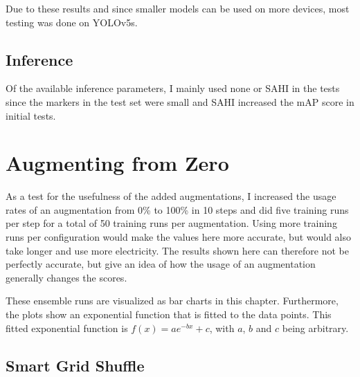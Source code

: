 \documentclass[10pt]{book}
\begin{document}

Due to these results and since smaller models can be used on more devices, most testing was done on \ac{YOLO}v5s.

\subsection{Inference}

Of the available inference parameters, I mainly used none or \ac{SAHI} in the tests since the markers in the test set were small and \ac{SAHI} increased the \ac{mAP} score in initial tests.

\section{Augmenting from Zero} %
\label{sec:aug_ens_zero}

As a test for the usefulness of the added augmentations, I increased the usage rates of an augmentation from 0\% to 100\% in 10 steps and did five training runs per step for a total of 50 training runs per augmentation. Using more training runs per configuration would make the values here more accurate, but would also take longer and use more electricity. The results shown here can therefore not be perfectly accurate, but give an idea of how the usage of an augmentation generally changes the scores. 

These ensemble runs are visualized as bar charts in this chapter. Furthermore, the plots show an exponential function that is fitted to the data points. This fitted exponential function is $f(x)=a\mathit{e}^{-bx}+c$, with $a$, $b$ and $c$ being arbitrary.

\subsection{Smart Grid Shuffle}
\end{document}
